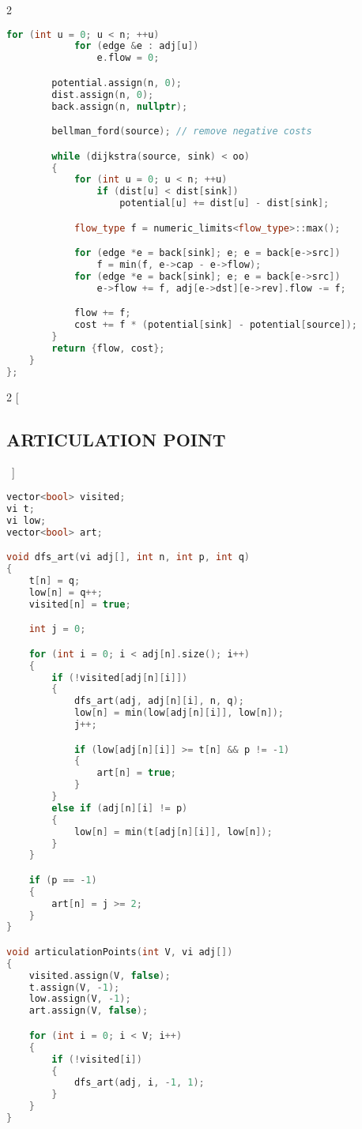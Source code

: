 \documentclass[leter]{amsart}
\begin{document}
\begin{multicols}{2}
\begin{lstlisting}[language=C++]
		for (int u = 0; u < n; ++u)
			for (edge &e : adj[u])
				e.flow = 0;

		potential.assign(n, 0);
		dist.assign(n, 0);
		back.assign(n, nullptr);

		bellman_ford(source); // remove negative costs

		while (dijkstra(source, sink) < oo)
		{
			for (int u = 0; u < n; ++u)
				if (dist[u] < dist[sink])
					potential[u] += dist[u] - dist[sink];

			flow_type f = numeric_limits<flow_type>::max();

			for (edge *e = back[sink]; e; e = back[e->src])
				f = min(f, e->cap - e->flow);
			for (edge *e = back[sink]; e; e = back[e->src])
				e->flow += f, adj[e->dst][e->rev].flow -= f;

			flow += f;
			cost += f * (potential[sink] - potential[source]);
		}
		return {flow, cost};
	}
};


\end{lstlisting}
\end{multicols}
\begin{multicols}{2}
[\subsection{ARTICULATION POINT}\ ]
\begin{lstlisting}[language=C++]
vector<bool> visited;
vi t;
vi low;
vector<bool> art;

void dfs_art(vi adj[], int n, int p, int q)
{
    t[n] = q;
    low[n] = q++;
    visited[n] = true;

    int j = 0;

    for (int i = 0; i < adj[n].size(); i++)
    {
        if (!visited[adj[n][i]])
        {
            dfs_art(adj, adj[n][i], n, q);
            low[n] = min(low[adj[n][i]], low[n]);
            j++;

            if (low[adj[n][i]] >= t[n] && p != -1)
            {
                art[n] = true;
            }
        }
        else if (adj[n][i] != p)
        {
            low[n] = min(t[adj[n][i]], low[n]);
        }
    }

    if (p == -1)
    {
        art[n] = j >= 2;
    }
}

void articulationPoints(int V, vi adj[])
{
    visited.assign(V, false);
    t.assign(V, -1);
    low.assign(V, -1);
    art.assign(V, false);

    for (int i = 0; i < V; i++)
    {
        if (!visited[i])
        {
            dfs_art(adj, i, -1, 1);
        }
    }
}


\end{lstlisting}
\end{multicols}
\end{document}
